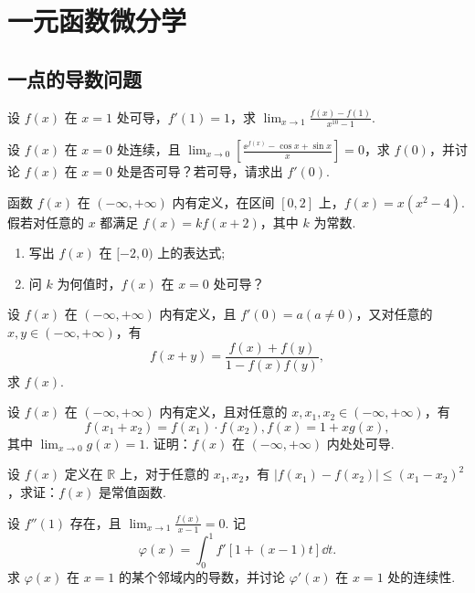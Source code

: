 \section{一元函数微分学}
	\subsection{一点的导数问题}

	\begin{ti}
		设 $f(x)$ 在 $x = 1$ 处可导，$f'(1) = 1$，求 $\lim_{x \to 1} \frac{f(x) - f(1)}{x^{10} - 1}$.
	\end{ti}

	\begin{ti}
		设 $f(x)$ 在 $x = 0$ 处连续，且 $\lim_{x \to 0} \left[ \frac{\ee^{f(x)} - \cos x + \sin x}{x} \right] = 0$，求 $f(0)$，并讨论 $f(x)$ 在 $x = 0$ 处是否可导？若可导，请求出 $f'(0)$.
	\end{ti}

	\begin{ti}
		函数 $f(x)$ 在 $(-\infty,+\infty)$ 内有定义，在区间 $[0,2]$ 上，$f(x) = x\left( x^{2} - 4 \right)$. 假若对任意的 $x$ 都满足 $f(x) = k f(x + 2)$，其中 $k$ 为常数.
		\begin{enumerate}
			\item 写出 $f(x)$ 在 $[-2,0)$ 上的表达式;
			\item 问 $k$ 为何值时，$f(x)$ 在 $x = 0$ 处可导？
		\end{enumerate}
	\end{ti}

	\begin{ti}
		设 $f(x)$ 在 $(-\infty,+\infty)$ 内有定义，且 $f'(0) = a(a \ne 0)$，又对任意的 $x,y \in (-\infty,+\infty)$，有
		\[
			f(x + y) = \frac{f(x) + f(y)}{1 - f(x)f(y)},
		\]
		求 $f(x)$.
	\end{ti}
	
	\begin{ti}
		设 $f(x)$ 在 $(-\infty,+\infty)$ 内有定义，且对任意的 $x,x_{1},x_{2} \in (-\infty,+\infty)$，有
		\[
			f(x_{1} + x_{2}) = f(x_{1}) \cdot f(x_{2}),f(x) = 1 + xg(x),
		\]
		其中 $\lim_{x \to 0} g(x) = 1$. 证明：$f(x)$ 在 $(-\infty,+\infty)$ 内处处可导.
	\end{ti}

	\begin{ti}
		设 $f(x)$ 定义在 $\mathbb{R}$ 上，对于任意的 $x_{1},x_{2}$，有 $|f(x_{1}) - f(x_{2})| \leq (x_{1} - x_{2})^{2}$，求证：$f(x)$ 是常值函数.
	\end{ti}

	\begin{ti}
		设 $f''(1)$ 存在，且 $\lim_{x \to 1}\frac{f(x)}{x - 1} = 0$. 记
		\[
			\varphi(x) = \int_{0}^{1} f'[1 + (x - 1)t]\dd{t}.
		\]
		求 $\varphi(x)$ 在 $x = 1$ 的某个邻域内的导数，并讨论 $\varphi'(x)$ 在 $x = 1$ 处的连续性.
	\end{ti}

